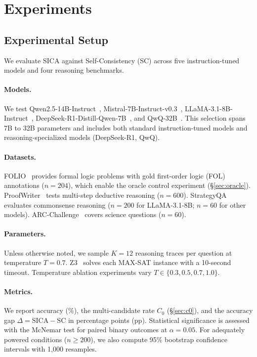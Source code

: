\section{Experiments}
\label{sec:experiments}

\subsection{Experimental Setup}
\label{sec:exp-setup}

We evaluate SICA against Self-Consistency (SC) across five instruction-tuned models and four reasoning benchmarks.

\paragraph{Models.} We test Qwen2.5-14B-Instruct~\cite{yang2024qwen25}, Mistral-7B-Instruct-v0.3~\cite{jiang2023mistral}, LLaMA-3.1-8B-Instruct~\cite{dubey2024llama3}, DeepSeek-R1-Distill-Qwen-7B~\cite{guo2025deepseekr1}, and QwQ-32B~\cite{qwen2024qwq}. This selection spans 7B to 32B parameters and includes both standard instruction-tuned models and reasoning-specialized models (DeepSeek-R1, QwQ).

\paragraph{Datasets.} FOLIO~\cite{han2022folio} provides formal logic problems with gold first-order logic (FOL) annotations ($n=204$), which enable the oracle control experiment (\S\ref{sec:oracle}). ProofWriter~\cite{tafjord2021proofwriter} tests multi-step deductive reasoning ($n=600$). StrategyQA~\cite{geva2021strategyqa} evaluates commonsense reasoning ($n=200$ for LLaMA-3.1-8B; $n=60$ for other models). ARC-Challenge~\cite{clark2018arc} covers science questions ($n=60$).

\paragraph{Parameters.} Unless otherwise noted, we sample $K=12$ reasoning traces per question at temperature $T=0.7$. Z3~\cite{demoura2008z3} solves each MAX-SAT instance with a 10-second timeout. Temperature ablation experiments vary $T \in \{0.3, 0.5, 0.7, 1.0\}$.

\paragraph{Metrics.} We report accuracy (\%), the multi-candidate rate $C_0$ (\S\ref{sec:c0}), and the accuracy gap $\Delta = \text{SICA} - \text{SC}$ in percentage points (pp). Statistical significance is assessed with the McNemar test for paired binary outcomes at $\alpha = 0.05$. For adequately powered conditions ($n \geq 200$), we also compute 95\% bootstrap confidence intervals with 1{,}000 resamples.


